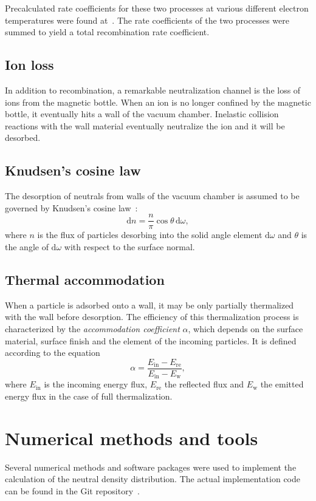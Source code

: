 \documentclass[a4paper,twoside,12pt]{article}
\begin{document}
Precalculated rate coefficients for these two processes at various different electron temperatures were found at~\cite{iaea:flychk}. The rate coefficients of the two processes were summed to yield a total recombination rate coefficient.

\subsection{Ion loss}
In addition to recombination, a remarkable neutralization channel is the loss of ions from the magnetic bottle. When an ion is no longer confined by the magnetic bottle, it eventually hits a wall of the vacuum chamber. Inelastic collision reactions with the wall material eventually neutralize the ion and it will be desorbed.

\subsection{Knudsen's cosine law}
The desorption of neutrals from walls of the vacuum chamber is assumed to be governed by Knudsen's cosine law~\cite{knudsen:cosine}:
\begin{equation}
    \mathrm{d}n = \frac{n}{\pi}\cos\theta \,\mathrm{d}\omega,
\end{equation}
where $n$ is the flux of particles desorbing into the solid angle element $\mathrm{d}\omega$ and $\theta$ is the angle of $\mathrm{d}\omega$ with respect to the surface normal.

\subsection{Thermal accommodation}
When a particle is adsorbed onto a wall, it may be only partially thermalized with the wall before desorption. The efficiency of this thermalization process is characterized by the \emph{accommodation coefficient} $\alpha$, which depends on the surface material, surface finish and the element of the incoming particles. It is defined according to the equation
\begin{equation}
    \alpha = \frac{E_\text{in} - E_\text{re}}{E_\text{in} - E_\text{w}},
\end{equation}
where $E_\text{in}$ is the incoming energy flux, $E_\text{re}$ the reflected flux and $E_\text{w}$ the emitted energy flux in the case of full thermalization.~\cite{sandia:accom}

\section{Numerical methods and tools}
Several numerical methods and software packages were used to implement the
calculation of the neutral density distribution. The actual implementation code
can be found in the Git repository~\cite{kapanen:git}.
\end{document}
